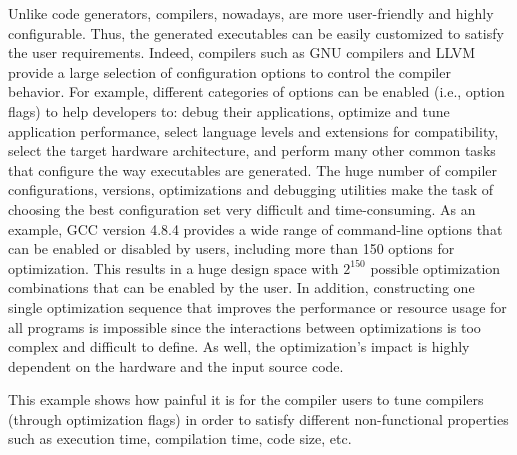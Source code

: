Unlike code generators, compilers, nowadays, are more user-friendly and highly configurable\cite{fursin2008milepost}. Thus, the generated executables can be easily customized to satisfy the user requirements. Indeed, compilers such as GNU compilers and LLVM provide a large selection of configuration options to control the compiler behavior. For example, different categories of options can be enabled (i.e., option flags) to help developers to: debug their applications, optimize and tune application performance, select language levels and extensions for compatibility, select the target hardware architecture, and perform many other common tasks that configure the way executables are generated.
The huge number of compiler configurations, versions, optimizations and debugging utilities make the task of choosing the best configuration set very difficult and time-consuming. As an example, GCC version 4.8.4 provides a wide range of command-line options that can be enabled or disabled by users, including more than 150 options for optimization. This results in a huge design space with $2^{150}$ possible optimization combinations that can be enabled by the user. In addition, constructing one single optimization sequence that improves the performance or resource usage for all programs is impossible since the interactions between optimizations is too complex and difficult to define. As well, the optimization's impact is highly dependent on the hardware and the input source code.


This example shows how painful it is for the compiler users to tune compilers (through optimization flags) in order to satisfy different non-functional properties such as execution time, compilation time, code size, etc.


